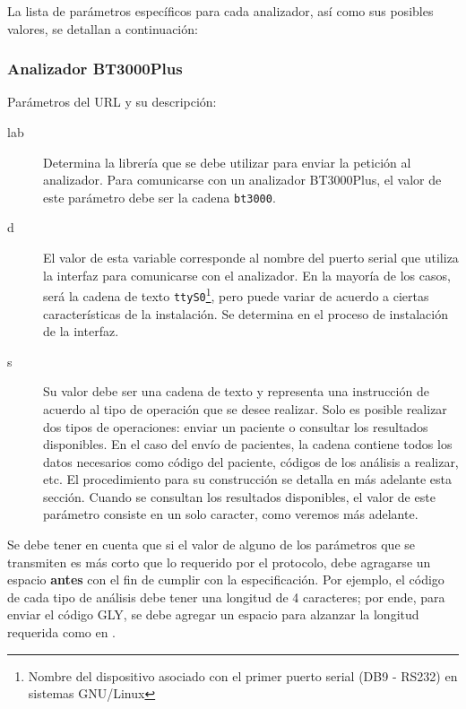 \documentclass[titlepage,12pt]{article}
\begin{document}
La lista de parámetros específicos para cada analizador, así como sus
posibles valores, se detallan a continuación:

\subsubsection{Analizador BT3000Plus}

Parámetros del URL y su descripción:

\begin{description}
  \item[\textsf{lab}] Determina la librería que se debe utilizar para
    enviar la petición al analizador. Para comunicarse con un
    analizador BT3000Plus, el valor de este parámetro debe ser la cadena
    \texttt{bt3000}.
  \item[\textsf{d}] El valor de esta variable corresponde al nombre
    del puerto serial que utiliza la interfaz para comunicarse con el
    analizador. En la mayoría de los casos, será la cadena de texto
    \texttt{ttyS0}\footnote{Nombre del dispositivo asociado con el
      primer puerto serial (DB9 - RS232) en sistemas GNU/Linux}, pero
    puede variar de acuerdo a ciertas características de la
    instalación. Se determina en el proceso de instalación de la
    interfaz.


  \item[\textsf{s}] Su valor debe ser una cadena de texto y representa
    una instrucción de acuerdo al tipo de operación que se desee
    realizar. Solo es posible realizar dos tipos de operaciones:
    enviar un paciente o consultar los resultados disponibles. En el
    caso del envío de pacientes, la cadena contiene todos los datos
    necesarios como código del paciente, códigos de los análisis a
    realizar, etc. El procedimiento para su construcción se detalla en
    más adelante esta sección. Cuando se consultan los resultados
    disponibles, el valor de este parámetro consiste en un solo
    caracter, como veremos más adelante.
\end{description}

Se debe tener en cuenta que si el valor de alguno de los parámetros
que se transmiten es más corto que lo requerido por el protocolo, debe
agragarse un espacio \textbf{antes} con el fin de cumplir con la
especificación. Por ejemplo, el código de cada tipo de análisis debe
tener una longitud de 4 caracteres; por ende, para enviar el código
\textsf{GLY}, se debe agregar un espacio para alzanzar la longitud
requerida como en .
\end{document}
